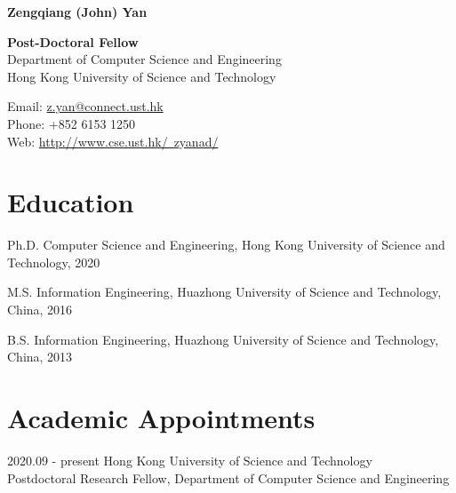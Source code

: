 \documentclass[12pt,letterpaper]{report}
\newcommand{\myname}{Zengqiang (John) Yan}
\newcommand{\namefont}[1]{{\normalfont\bfseries\Huge{#1}}}
\begin{document}
	\raggedright
	
	\namefont{\myname}
	
	\vspace{1em}
	\begin{minipage}[t]{0.6\textwidth}
		\textbf{Post-Doctoral Fellow}\\
		Department of Computer Science and Engineering \\
		Hong Kong University of Science and Technology
	\end{minipage}
	\begin{minipage}[t]{0.39\textwidth}
		Email: \href{mailto:z.yan@connect.ust.hk}{z.yan@connect.ust.hk} \\
		Phone: +852 6153 1250 \\
		Web: \href{http://www.cse.ust.hk/~zyanad/}{http://www.cse.ust.hk/~zyanad/}
	\end{minipage}
	\vspace{0.5em}
	
	
	
	\section*{Education}
	
	\begin{tablist}
		
		\item[Ph.D.] \tab Computer Science and Engineering, Hong Kong University of Science and Technology, 2020
		
		\item[M.S.]  \tab Information Engineering, Huazhong University of Science and Technology, China, 2016
		
		\item[B.S.]  \tab Information Engineering, Huazhong University of Science and Technology, China, 2013
		
	\end{tablist}
	
	
	
	\section*{Academic Appointments}
	
	\begin{tablist}
		
		\item[2020.09 - present]   \tab Hong Kong University of Science and Technology \\
		\tab Postdoctoral Research Fellow, Department of Computer Science and Engineering
		
	\end{tablist}
	
\end{document}
